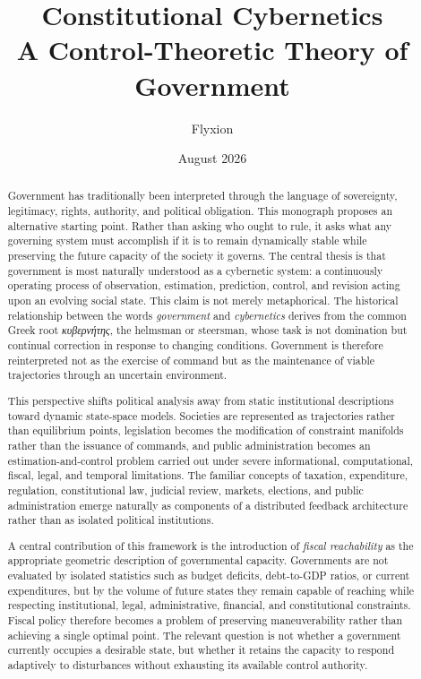 \documentclass[12pt,a4paper]{article}
\title{
\Huge Constitutional Cybernetics\\[1em]
\Large A Control-Theoretic Theory of Government
}
\author{
Flyxion
}
\date{
August 2026
}
\begin{document}
\maketitle

\begin{abstract}

Government has traditionally been interpreted through the language of sovereignty, legitimacy, rights, authority, and political obligation. This monograph proposes an alternative starting point. Rather than asking who ought to rule, it asks what any governing system must accomplish if it is to remain dynamically stable while preserving the future capacity of the society it governs. The central thesis is that government is most naturally understood as a cybernetic system: a continuously operating process of observation, estimation, prediction, control, and revision acting upon an evolving social state. This claim is not merely metaphorical. The historical relationship between the words \emph{government} and \emph{cybernetics} derives from the common Greek root \emph{κυβερνήτης}, the helmsman or steersman, whose task is not domination but continual correction in response to changing conditions. Government is therefore reinterpreted not as the exercise of command but as the maintenance of viable trajectories through an uncertain environment.

This perspective shifts political analysis away from static institutional descriptions toward dynamic state-space models. Societies are represented as trajectories rather than equilibrium points, legislation becomes the modification of constraint manifolds rather than the issuance of commands, and public administration becomes an estimation-and-control problem carried out under severe informational, computational, fiscal, legal, and temporal limitations. The familiar concepts of taxation, expenditure, regulation, constitutional law, judicial review, markets, elections, and public administration emerge naturally as components of a distributed feedback architecture rather than as isolated political institutions.

A central contribution of this framework is the introduction of \emph{fiscal reachability} as the appropriate geometric description of governmental capacity. Governments are not evaluated by isolated statistics such as budget deficits, debt-to-GDP ratios, or current expenditures, but by the volume of future states they remain capable of reaching while respecting institutional, legal, administrative, financial, and constitutional constraints. Fiscal policy therefore becomes a problem of preserving maneuverability rather than achieving a single optimal point. The relevant question is not whether a government currently occupies a desirable state, but whether it retains the capacity to respond adaptively to disturbances without exhausting its available control authority.


\end{abstract}
\end{document}

